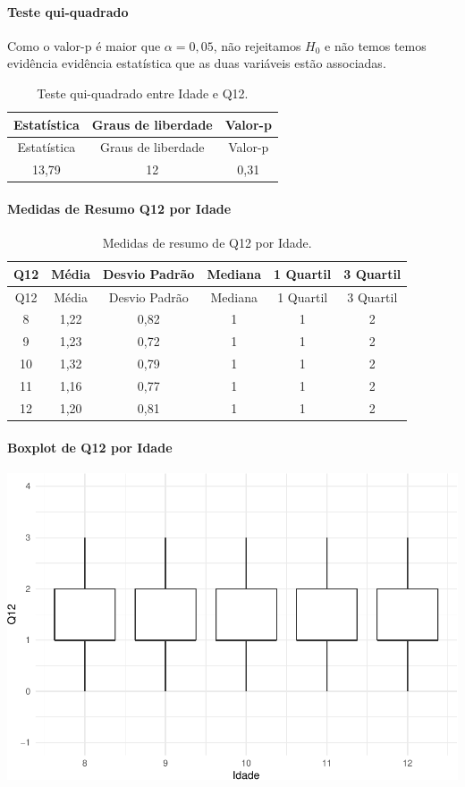 \documentclass[]{article}
\let\oldparagraph\paragraph
\renewcommand{\paragraph}[1]{\oldparagraph{#1}\mbox{}}
\begin{document}
\hypertarget{teste-qui-quadrado-4}{%
\paragraph{Teste qui-quadrado}\label{teste-qui-quadrado-4}}

Como o valor-p é maior que \(\alpha=0,05\), não rejeitamos \(H_0\) e não temos temos evidência evidência estatística que as duas variáveis estão associadas.

\begin{longtable}[]{@{}ccc@{}}
\caption{\label{tab:unnamed-chunk-33}Teste qui-quadrado entre Idade e Q12.}\tabularnewline
\toprule
Estatística & Graus de liberdade & Valor-p\tabularnewline
\midrule
\endfirsthead
\toprule
Estatística & Graus de liberdade & Valor-p\tabularnewline
\midrule
\endhead
13,79 & 12 & 0,31\tabularnewline
\bottomrule
\end{longtable}

\cleardoublepage

\hypertarget{medidas-de-resumo-q12-por-idade}{%
\paragraph{Medidas de Resumo Q12 por Idade}\label{medidas-de-resumo-q12-por-idade}}

\begin{longtable}[]{@{}cccccc@{}}
\caption{\label{tab:unnamed-chunk-34}Medidas de resumo de Q12 por Idade.}\tabularnewline
\toprule
Q12 & Média & Desvio Padrão & Mediana & 1 Quartil & 3 Quartil\tabularnewline
\midrule
\endfirsthead
\toprule
Q12 & Média & Desvio Padrão & Mediana & 1 Quartil & 3 Quartil\tabularnewline
\midrule
\endhead
8 & 1,22 & 0,82 & 1 & 1 & 2\tabularnewline
9 & 1,23 & 0,72 & 1 & 1 & 2\tabularnewline
10 & 1,32 & 0,79 & 1 & 1 & 2\tabularnewline
11 & 1,16 & 0,77 & 1 & 1 & 2\tabularnewline
12 & 1,20 & 0,81 & 1 & 1 & 2\tabularnewline
\bottomrule
\end{longtable}

\hypertarget{boxplot-de-q12-por-idade}{%
\paragraph{Boxplot de Q12 por Idade}\label{boxplot-de-q12-por-idade}}

\begin{center}\includegraphics[width=0.75\linewidth]{relatorio_files/figure-latex/unnamed-chunk-35-1} \end{center}
\end{document}
